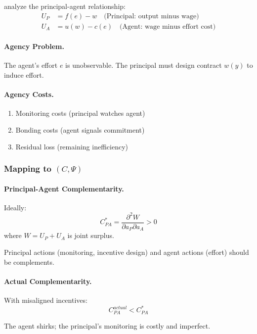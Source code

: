 \documentclass[12pt,a4paper]{article}
\begin{document}
\citet{jensenmeckling1976} analyze the principal-agent relationship:
\begin{align}
  U_P &= f(e) - w \quad \text{(Principal: output minus wage)} \\
  U_A &= u(w) - c(e) \quad \text{(Agent: wage minus effort cost)}
\end{align}

\paragraph{Agency Problem.}
The agent's effort $e$ is unobservable. 
The principal must design contract $w(y)$ to induce effort.

\paragraph{Agency Costs.}
\begin{enumerate}
  \item Monitoring costs (principal watches agent)
  \item Bonding costs (agent signals commitment)
  \item Residual loss (remaining inefficiency)
\end{enumerate}

\subsubsection{Mapping to $(C, \Psi)$}

\paragraph{Principal-Agent Complementarity.}
Ideally:
\begin{equation}
  C_{PA}^* = \frac{\partial^2 W}{\partial a_P \partial a_A} > 0
\end{equation}
where $W = U_P + U_A$ is joint surplus.

Principal actions (monitoring, incentive design) and agent actions (effort) 
should be complements.

\paragraph{Actual Complementarity.}
With misaligned incentives:
\begin{equation}
  C_{PA}^{actual} < C_{PA}^*
\end{equation}

The agent shirks; the principal's monitoring is costly and imperfect.
\end{document}
